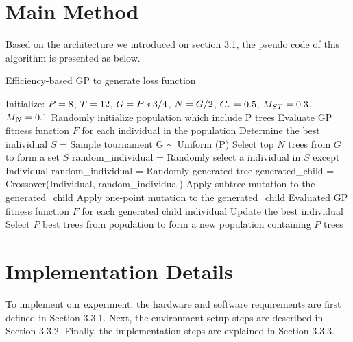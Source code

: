 \begin{ZhChapter}

\section{Main Method}
Based on the architecture we introduced on section 3.1, the pseudo code of this algorithm is presented as below.
\begin{algorithm}
    \caption{Efficiency-based GP to generate loss function}\label{alg:cap}
    \begin{algorithmic}
        \State Initialize: \space $P = \space 8$, $T =\space 12$, $G =\space P*3/4$, $N = \space G/2$, $C_r = \space0.5$, $M_{ST} = \space0.3$, $M_N = \space0.1$
        \State Randomly initialize population which include P trees
        \State Evaluate GP fitness function $F$ for each individual in the population
        \State Determine the best individual
        \State $S$ = Sample tournament G $\sim$ Uniform (P)
        \State Select top $N$ trees from $G$ to form a set $S$
        \State random\_individual = Randomly select a individual in $S$ except Individual
        \Else
        \State random\_individual = Randomly generated tree
        \EndIf
        \State generated\_child = Crossover(Individual, random\_individual)
        \State Apply subtree mutation to the generated\_child
        \EndIf
        \State Apply one-point mutation to the generated\_child
        \EndIf
        \EndFor
        \State Evaluated GP fitness function $F$ for each generated child individual
        \State Update the best individual
        \State Select $P$ best trees from population to form a new population containing $P$ trees
        \EndWhile
    \end{algorithmic}
\end{algorithm}

\section{Implementation Details}
To implement our experiment, the hardware and software requirements are first defined in Section 3.3.1. Next, the environment setup steps are described in Section 3.3.2. Finally, the implementation steps are explained in Section 3.3.3.

\end{ZhChapter}
